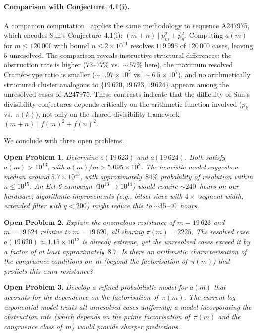 \documentclass[11pt]{article}
\newtheorem{openproblem}{Open Problem}
\theoremstyle{definition}
\theoremstyle{remark}
\numberwithin{equation}{section}
\begin{document}
\paragraph{Comparison with Conjecture~4.1(i).}
A companion computation~\cite{CortiA247975} applies the same
methodology to sequence A247975, which encodes
Sun's Conjecture~4.1(i): $(m+n) \mid p_m^2 + p_n^2$.
Computing $a(m)$ for $m \le 120\,000$ with bound $n \le 2 \times 10^{11}$
resolves $119\,995$ of $120\,000$ cases, leaving $5$ unresolved.
The comparison reveals instructive structural differences:
the obstruction rate is higher ($73$--$77\%$ vs.\ ${\sim}\,57\%$
here), the maximum resolved Cram\'er-type ratio is smaller
(${\sim}\,1.97 \times 10^5$ vs.\ ${\sim}\,6.5 \times 10^7$),
and no arithmetically structured cluster analogous to
$\{19\,620, 19\,623, 19\,624\}$ appears among the unresolved cases
of A247975.
These contrasts indicate that the difficulty of Sun's divisibility
conjectures depends critically on the arithmetic function involved
($p_k$ vs.\ $\pi(k)$), not only on the shared divisibility
framework $(m+n) \mid f(m)^2 + f(n)^2$.

We conclude with three open problems.

\begin{openproblem}\label{op:unresolved}
Determine $a(19\,623)$ and $a(19\,624)$.  Both satisfy
$a(m) > 10^{13}$, with $a(m)/m > 5.095 \times 10^8$.
The heuristic model suggests a median around
$5.7 \times 10^{13}$, with approximately~$84\%$ probability
of resolution within $n \le 10^{15}$.
An Ext-6 campaign ($10^{13} \to 10^{14}$) would require
$\sim 240$~hours on our hardware; algorithmic improvements
(e.g., bitset sieve with $4\times$ segment width,
extended filter with $q < 200$) might reduce this to
$\sim 35$--$40$~hours.
\end{openproblem}

\begin{openproblem}\label{op:cluster}
Explain the anomalous resistance of $m = 19\,623$ and
$m = 19\,624$ relative to $m = 19\,620$, all sharing
$\pi(m) = 2225$.  The resolved case $a(19\,620) \approx
1.15 \times 10^{12}$ is already extreme, yet the unresolved
cases exceed it by a factor of at least approximately~$8.7$.
Is there an arithmetic characterisation of the congruence
conditions on~$m$ (beyond the factorisation of~$\pi(m)$) that
predicts this extra resistance?
\end{openproblem}

\begin{openproblem}\label{op:model}
Develop a refined probabilistic model for $a(m)$ that
accounts for the dependence on the factorisation of~$\pi(m)$.
The current log-exponential model treats all unresolved cases
uniformly; a model incorporating the obstruction rate
(which depends on the prime factorisation of~$\pi(m)$ and the
congruence class of~$m$) would provide sharper predictions.
\end{openproblem}
\end{document}
